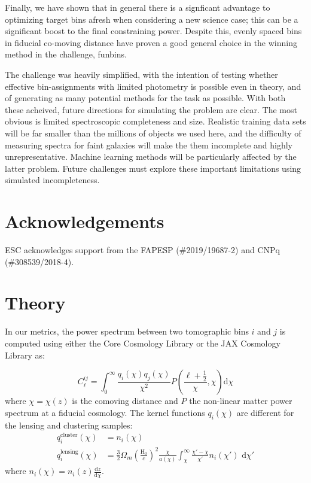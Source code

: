 \documentclass[twocolumn,twocolappendix]{aastex63}
\begin{document}
Finally, we have shown that in general there is a signficant advantage to optimizing
target bins afresh when considering a new science case; this can be a significant boost
to the final constraining power.
Despite this, evenly spaced bins in fiducial co-moving distance have proven
a good general choice in the winning method in the challenge, {\sc funbins}.

The challenge was heavily simplified, with the intention of testing whether
effective bin-assignments with limited photometry is possible even in theory,
and of generating as many potential methods for the task as possible.  With
both these acheived, future directions for simulating the problem are clear.
The most obvious is limited spectroscopic completeness and size.  Realistic
training data sets will be far smaller than the millions of objects we used here,
and the difficulty of measuring spectra for faint galaxies will make the them
incomplete and highly unrepresentative. Machine learning methods will be particularly
affected by the latter problem.  Future challenges must explore these important limitations
using simulated incompleteness.


\section{Acknowledgements}
ESC acknowledges support from the FAPESP (\#2019/19687-2) and CNPq  (\#308539/2018-4).




\appendix

\section{Theory}\label{app:theory}

In our metrics, the power spectrum between two tomographic bins $i$ and $j$ is
computed using either the Core Cosmology Library \citep{ccl} or the JAX
Cosmology Library \citep{jax-cosmo} as:

\begin{equation}
    C^{ij}_\ell = \int_0^{\infty} \frac{q_i(\chi) q_j(\chi)}{\chi^2} P\left(\frac{\ell +\frac{1}{2}}{\chi}, \chi \right) \mathrm{d}\chi
\end{equation}
where $\chi = \chi(z)$ is the comoving distance and $P$ the non-linear matter power spectrum at
a fiducial cosmology.  The kernel functions $q_i(\chi)$ are different for the lensing and clustering samples:
\begin{align}
    q^{\mathrm{cluster}}_i(\chi) &= n_i(\chi)\\
    q^{\mathrm{lensing}}_i(\chi) &= \frac{3}{2}\Omega_m \left(\frac{\mathrm{H}_0}{c}\right)^2 \frac{\chi}{a(\chi)} \int_\chi^{\infty} \frac{\chi' - \chi}{\chi'} n_i(\chi')\,\,\mathrm{d}\chi'
\end{align}
where $n_i(\chi) = n_i(z) \frac{\mathrm{d}z}{\mathrm{d}\chi}$.
\end{document}
